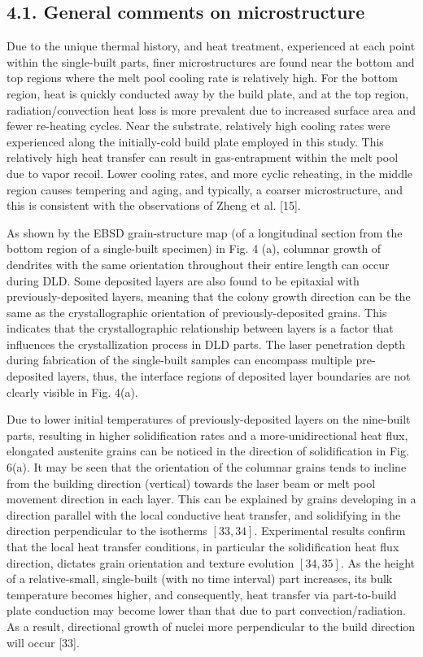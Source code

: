 \documentclass[10pt]{article}
\begin{document}
\subsection*{4.1. General comments on microstructure}
Due to the unique thermal history, and heat treatment, experienced at each point within the single-built parts, finer microstructures are found near the bottom and top regions where the melt pool cooling rate is relatively high. For the bottom region, heat is quickly conducted away by the build plate, and at the top region, radiation/convection heat loss is more prevalent due to increased surface area and fewer re-heating cycles. Near the substrate, relatively high cooling rates were experienced along the initially-cold build plate employed in this study. This relatively high heat transfer can result in gas-entrapment within the melt pool due to vapor recoil. Lower cooling rates, and more cyclic reheating, in the middle region causes tempering and aging, and typically, a coarser microstructure, and this is consistent with the observations of Zheng et al. [15].

As shown by the EBSD grain-structure map (of a longitudinal section from the bottom region of a single-built specimen) in Fig. 4 (a), columnar growth of dendrites with the same orientation throughout their entire length can occur during DLD. Some deposited layers are also found to be epitaxial with previously-deposited layers, meaning that the colony growth direction can be the same as the crystallographic orientation of previously-deposited grains. This indicates that the crystallographic relationship between layers is a factor that influences the crystallization process in DLD parts. The laser penetration depth during fabrication of the single-built samples can encompass multiple pre-deposited layers, thus, the interface regions of deposited layer boundaries are not clearly visible in Fig. 4(a).

Due to lower initial temperatures of previously-deposited layers on the nine-built parts, resulting in higher solidification rates and a more-unidirectional heat flux, elongated austenite grains can be noticed in the direction of solidification in Fig. 6(a). It may be seen that the orientation of the columnar grains tends to incline from the building direction (vertical) towards the laser beam or melt pool movement direction in each layer. This can be explained by grains developing in a direction parallel with the local conductive heat transfer, and solidifying in the direction perpendicular to the isotherms $[33,34]$. Experimental results confirm that the local heat transfer conditions, in particular the solidification heat flux direction, dictates grain orientation and texture evolution $[34,35]$. As the height of a relative-small, single-built (with no time interval) part increases, its bulk temperature becomes higher, and consequently, heat transfer via part-to-build plate conduction may become lower than that due to part convection/radiation. As a result, directional growth of nuclei more perpendicular to the build direction will occur [33].
\end{document}
